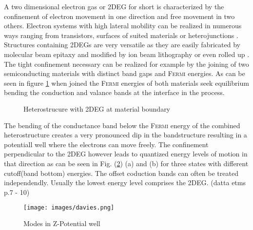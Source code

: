 A two dimensional electron gas or 2DEG for short is characterized by the confinement of electron movement in one direction and free movement in two others. 
Electron systems with high lateral mobility can be realized in numerous ways ranging from transistors, surfaces of suited materials \cite{PhysRevLett.12.271} or heterojunctions \cite{JVSTB.4.853}. Structures containing 2DEGs are very versatile as they are easily fabricated by molecular beam epitaxy and modified by ion beam lithography \cite{Ingram1995}\cite{Nowack2009Thesis} or even rolled up \cite{Vorob'ev2004171}.
The tight confinement necessary can be realized for example by the joining of two semiconducting materials with distinct band gaps and \textsc{Fermi} energies. As can be seen in figure \ref{fig:hetero2deg} when joined the \textsc{Fermi} energies of both materials seek equilibrium bending the conduction and valance bands at the interface in the process.
\begin{figure}[h]
\centering
{} \quad\quad
{} \quad\quad
{}
\caption{Heterostrucure with 2DEG at material boundary}
\label{fig:hetero2deg}
\end{figure}
The bending of the conductance band below the \textsc{Fermi} energy of the combined heterostructure creates a very pronounced dip in the bandstructure resulting in a potentiall well where the electrons can move freely. The confinement perpendicular to the 2DEG however leads to quantized energy levels of motion in that direction as can be seen in Fig. (\ref{fig:potentialwell}) (a) and (b) for three states with different cutoff(band bottom) energies. The offset coduction bands can often be treated independendly. Usually the lowest energy level comprises the 2DEG.
 (datta etms p.7 - 10)
\begin{figure}
\centering
\texttt{[image: images/davies.png]}
\caption{Modes in Z-Potential well}
\label{fig:potentialwell}
\end{figure}
